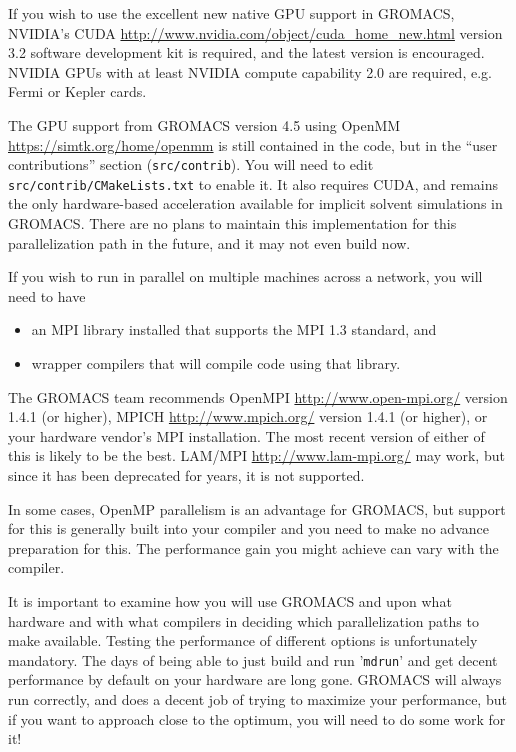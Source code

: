 \documentclass{article}[12pt,a4paper,twoside]
\newcommand{\gromacs}{GROMACS}
\newcommand{\nvidia}{NVIDIA}
\newcommand{\cuda}{CUDA}
\newcommand{\mpi}{MPI}
\newcommand{\openmpi}{OpenMPI}
\newcommand{\openmp}{OpenMP}
\newcommand{\openmm}{OpenMM}
\newcommand{\lammpi}{LAM/MPI}
\newcommand{\mpich}{MPICH}
\newcommand{\cudaversion}{3.2}
\begin{document}
If you wish to use the excellent new native GPU support in \gromacs,
\nvidia{}'s \cuda{}
\url{http://www.nvidia.com/object/cuda_home_new.html} version
\cudaversion{} software development kit is required, and the latest
version is encouraged. \nvidia{} GPUs with at least \nvidia{} compute
capability 2.0 are required, e.g. Fermi or Kepler cards.

The GPU support from \gromacs{} version 4.5 using \openmm{}
\url{https://simtk.org/home/openmm} is still contained in the code,
but in the ``user contributions'' section (\texttt{src/contrib}). You
will need to edit \texttt{src/contrib/CMakeLists.txt} to enable it. It
also requires \cuda{}, and remains the only hardware-based
acceleration available for implicit solvent simulations in
\gromacs{}. There are no plans to maintain this implementation for
this parallelization path in the future, and it may not even build
now.

If you wish to run in parallel on multiple machines across a network,
you will need to have
\begin{itemize}
\item an \mpi{} library installed that supports the \mpi{} 1.3
  standard, and
\item wrapper compilers that will compile code using that library.
\end{itemize}
The \gromacs{} team recommends \openmpi{}
\url{http://www.open-mpi.org/} version 1.4.1 (or higher), \mpich{}
\url{http://www.mpich.org/} version 1.4.1 (or higher), or your
hardware vendor's \mpi{} installation. The most recent version of
either of this is likely to be the best. \lammpi{}
\url{http://www.lam-mpi.org/} may work, but since it has been
deprecated for years, it is not supported.

In some cases, \openmp{} parallelism is an advantage for \gromacs{},
but support for this is generally built into your compiler and you
need to make no advance preparation for this. The performance gain you
might achieve can vary with the compiler.

It is important to examine how you will use \gromacs{} and upon what
hardware and with what compilers in deciding which parallelization
paths to make available. Testing the performance of different options
is unfortunately mandatory. The days of being able to just build and
run '\verb+mdrun+' and get decent performance by default on your
hardware are long gone. \gromacs{} will always run correctly, and does
a decent job of trying to maximize your performance, but if you want
to approach close to the optimum, you will need to do some work for
it!
\end{document}
